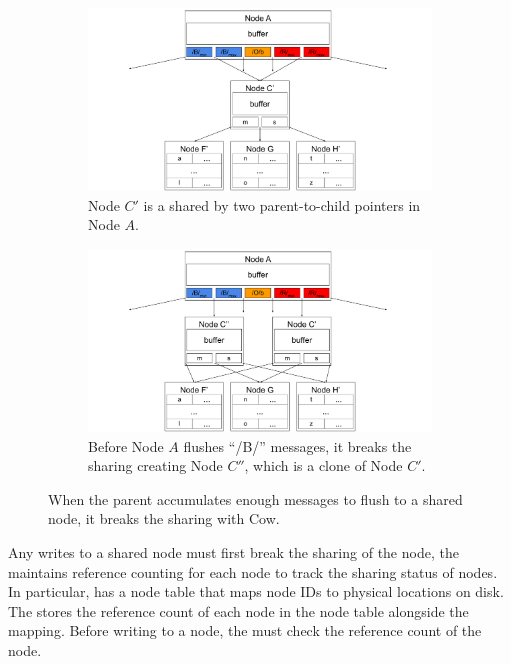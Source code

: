 \begin{figure}
    \begin{subfigure}{\textwidth}
        \centering
        \includegraphics[width=.9\linewidth]{fig/rc-3}
        \caption{\label{subfig:cow-1} Node $C'$ is a shared by two
            parent-to-child pointers in Node $A$.}
    \end{subfigure}
    \begin{subfigure}{\textwidth}
        \centering
        \includegraphics[width=.9\linewidth]{fig/cow-2}
        \caption{\label{subfig:cow-2} Before Node $A$ flushes ``/B/'' messages,
            it breaks the sharing creating Node $C''$, which is a clone of Node
            $C'$.}
    \end{subfigure}
    \caption[\bedags break node sharing with CoW]{\label{fig:cow}
        When the parent accumulates enough messages to flush to a shared node,
        it breaks the sharing with Cow.}
\end{figure}

Any writes to a shared node must first break the sharing of the node, the
\bedag maintains reference counting for each node to track the sharing status of
nodes.
In particular, \fti has a node table that maps node IDs to physical locations on
disk.
The \bedag stores the reference count of each node in the node table alongside
the mapping.
Before writing to a node, the \bedag must check the reference count of the node.

